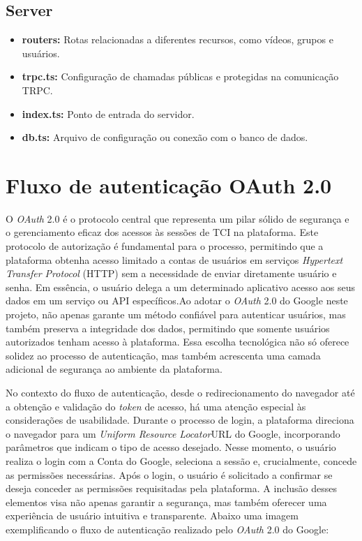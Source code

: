 \subsection{Server}
\label{server}
\begin{itemize}
\item \textbf{routers:} Rotas relacionadas a diferentes recursos, como vídeos, grupos e usuários.
\item \textbf{trpc.ts:} Configuração de chamadas públicas e protegidas na comunicação TRPC.
\item \textbf{index.ts:} Ponto de entrada do servidor.
\item \textbf{db.ts:} Arquivo de configuração ou conexão com o banco de dados.
\end{itemize}


\section{Fluxo de autenticação OAuth 2.0}
O \textit{OAuth} 2.0 é o protocolo central que representa um pilar sólido de segurança e o gerenciamento eficaz dos acessos às sessões de TCI na plataforma. Este protocolo de autorização é fundamental para o processo, permitindo que a plataforma obtenha acesso limitado a contas de usuários em serviços \textit{Hypertext Transfer Protocol} (HTTP) sem a necessidade de enviar diretamente usuário e senha. Em essência, o usuário delega a um determinado aplicativo acesso aos seus dados em um serviço ou API específicos.\cite{OAUTH}Ao adotar o \textit{OAuth} 2.0 do Google neste projeto, não apenas garante um método confiável para autenticar usuários, mas também preserva a integridade dos dados, permitindo que somente usuários autorizados tenham acesso à plataforma. Essa escolha tecnológica não só oferece solidez ao processo de autenticação, mas também acrescenta uma camada adicional de segurança ao ambiente da plataforma.

No contexto do fluxo de autenticação, desde o redirecionamento do navegador até a obtenção e validação do \textit{token} de acesso, há uma atenção especial às considerações de usabilidade. Durante o processo de login, a plataforma direciona o navegador para um \textit{Uniform Resource Locator}URL do Google, incorporando parâmetros que indicam o tipo de acesso desejado. Nesse momento, o usuário realiza o login com a Conta do Google, seleciona a sessão e, crucialmente, concede as permissões necessárias. Após o login, o usuário é solicitado a confirmar se deseja conceder as permissões requisitadas pela plataforma. A inclusão desses elementos visa não apenas garantir a segurança, mas também oferecer uma experiência de usuário intuitiva e transparente. Abaixo uma imagem exemplificando o fluxo de autenticação realizado pelo \textit{OAuth} 2.0 do Google\cite{OAUTHACESS}:

